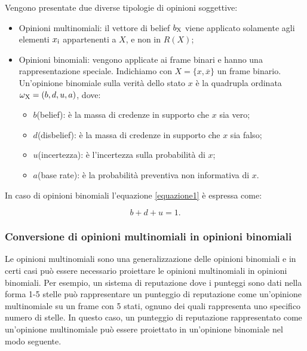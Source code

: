 \documentclass{report}
\begin{document}
	Vengono presentate due diverse tipologie di opinioni soggettive:
	
	\begin{itemize}
		\item
		Opinioni multinomiali: il vettore di belief $b\textsubscript{X}$ viene
		applicato solamente agli elementi $x\textsubscript{i}$ appartenenti a $X$, e non in $R(X)$;
		\item
		Opinioni binomiali: vengono applicate ai frame binari e hanno una
		rappresentazione speciale. Indichiamo con $X = \{x,\overline{x}\}$ un frame
		binario. Un'opinione binomiale sulla verità dello stato $x$ è la
		quadrupla ordinata $\omega\textsubscript{X}=(b,d,u,a)$, dove:
		
		\begin{itemize}
			\item
			$b$(belief): è la massa di credenze in supporto che $x$ sia vero;
			\item
			$d$(disbelief): è la massa di credenze in supporto che $x$ sia falso;
			\item
			$u$(incertezza): è l'incertezza sulla probabilità di $x$;
			\item
			$a$(base rate): è la probabilità preventiva non informativa di $x$.
		\end{itemize}
	\end{itemize}
	
	In caso di opinioni binomiali l'equazione \eqref{equazione1} è espressa come:
	\begin{center}
	\begin{equation}
	b+d+u=1. \label{equazione3}
	\end{equation}
	
	\end{center}
	
	\hypertarget{header-n89}{%
		\subsubsection{Conversione di opinioni multinomiali in opinioni
			binomiali}\label{header-n89}}
	
	Le opinioni multinomiali sono una generalizzazione delle opinioni
	binomiali e in certi casi può essere necessario proiettare le opinioni
	multinomiali in opinioni binomiali. Per esempio, un sistema di
	reputazione dove i punteggi sono dati nella forma 1-5 stelle può
	rappresentare un punteggio di reputazione come un'opinione multinomiale
	su un frame con 5 stati, ognuno dei quali rappresenta uno specifico
	numero di stelle. In questo caso, un punteggio di reputazione
	rappresentato come un'opinione multinomiale può essere proiettato in
	un'opinione binomiale nel modo seguente.
	
\end{document}
